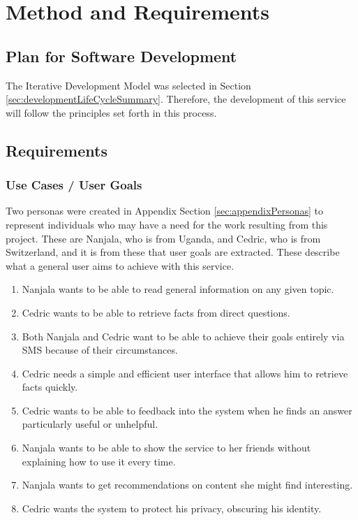\documentclass{article}
\begin{document}
\newpage
\section{Method and Requirements}
\label{sec:method}

\subsection{Plan for Software Development}
The Iterative Development Model was selected in Section \ref{sec:developmentLifeCycleSummary}.  Therefore, the development of this service will follow the principles set forth in this process.

\subsection{Requirements}
\subsubsection{Use Cases / User Goals}
Two personas were created in Appendix Section \ref{sec:appendixPersonas} to represent individuals who may have a need for the work resulting from this project.  These are Nanjala, who is from Uganda, and Cedric, who is from Switzerland, and it is from these that user goals are extracted.  These describe what a general user aims to achieve with this service.
\begin{enumerate}
  \item Nanjala wants to be able to read general information on any given topic.
  \item Cedric wants to be able to retrieve facts from direct questions.
  \item Both Nanjala and Cedric want to be able to achieve their goals entirely via SMS because of their circumstances.
  \item Cedric needs a simple and efficient user interface that allows him to retrieve facts quickly. 
  \item Cedric wants to be able to feedback into the system when he finds an answer particularly useful or unhelpful. 
  \item Nanjala wants to be able to show the service to her friends without explaining how to use it every time.
  \item Nanjala wants to get recommendations on content she might find interesting. 
  \item Cedric wants the system to protect his privacy, obscuring his identity.
\end{enumerate}
\end{document}
